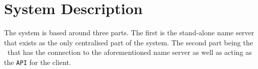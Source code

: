 \section{System Description}
The system is based around three parts. The first is the stand-alone name server that exists as the only centralised part of the system. The second part being the \mw\ that has the connection to the aforementioned name server as well as acting as the \texttt{API} for the client.



